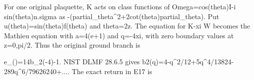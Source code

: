 \documentclass[11pt,a4paper]{article}
\renewcommand{\[}{\begingroup\small\originaldisplaystart}
\renewcommand{\]}{\originaldisplayend\endgroup}
\begin{document}
For one original plaquette, K acts on class functions of
{\ttfamily O\allowbreak{}m\allowbreak{}e\allowbreak{}g\allowbreak{}a\allowbreak{}=\allowbreak{}c\allowbreak{}o\allowbreak{}s\allowbreak{}(\allowbreak{}t\allowbreak{}h\allowbreak{}e\allowbreak{}t\allowbreak{}a\allowbreak{})\allowbreak{}I\allowbreak{}-\allowbreak{}i\allowbreak{} \allowbreak{}s\allowbreak{}i\allowbreak{}n\allowbreak{}(\allowbreak{}t\allowbreak{}h\allowbreak{}e\allowbreak{}t\allowbreak{}a\allowbreak{})\allowbreak{}n\allowbreak{}.\allowbreak{}s\allowbreak{}i\allowbreak{}g\allowbreak{}m\allowbreak{}a\allowbreak{}}
as
{\ttfamily -\allowbreak{}(\allowbreak{}p\allowbreak{}a\allowbreak{}r\allowbreak{}t\allowbreak{}i\allowbreak{}a\allowbreak{}l\allowbreak{}\_\allowbreak{}t\allowbreak{}h\allowbreak{}e\allowbreak{}t\allowbreak{}a\allowbreak{}\textasciicircum{}\allowbreak{}2\allowbreak{}+\allowbreak{}2\allowbreak{}c\allowbreak{}o\allowbreak{}t\allowbreak{}(\allowbreak{}t\allowbreak{}h\allowbreak{}e\allowbreak{}t\allowbreak{}a\allowbreak{})\allowbreak{}p\allowbreak{}a\allowbreak{}r\allowbreak{}t\allowbreak{}i\allowbreak{}a\allowbreak{}l\allowbreak{}\_\allowbreak{}t\allowbreak{}h\allowbreak{}e\allowbreak{}t\allowbreak{}a\allowbreak{})\allowbreak{}}.
Put
{\ttfamily u\allowbreak{}(\allowbreak{}t\allowbreak{}h\allowbreak{}e\allowbreak{}t\allowbreak{}a\allowbreak{})\allowbreak{}=\allowbreak{}s\allowbreak{}i\allowbreak{}n\allowbreak{}(\allowbreak{}t\allowbreak{}h\allowbreak{}e\allowbreak{}t\allowbreak{}a\allowbreak{})\allowbreak{}f\allowbreak{}(\allowbreak{}t\allowbreak{}h\allowbreak{}e\allowbreak{}t\allowbreak{}a\allowbreak{})\allowbreak{}}
and
{\ttfamily t\allowbreak{}h\allowbreak{}e\allowbreak{}t\allowbreak{}a\allowbreak{}=\allowbreak{}2\allowbreak{}z\allowbreak{}}.
The equation for
{\ttfamily K\allowbreak{}-\allowbreak{}x\allowbreak{}i\allowbreak{} \allowbreak{}W\allowbreak{}}
becomes the Mathieu equation with
{\ttfamily a\allowbreak{}=\allowbreak{}4\allowbreak{}(\allowbreak{}e\allowbreak{}+\allowbreak{}1\allowbreak{})\allowbreak{}}
and
{\ttfamily q\allowbreak{}=\allowbreak{}-\allowbreak{}4\allowbreak{}x\allowbreak{}i\allowbreak{}},
with zero boundary values at z=0,pi/2. Thus the original ground branch
is

\[
 e_{}(\xi)=\tfrac14b_2(-4\xi)-1.
\] NIST DLMF 28.6.5 gives
{\ttfamily b\allowbreak{}2\allowbreak{}(\allowbreak{}q\allowbreak{})\allowbreak{}=\allowbreak{}4\allowbreak{}-\allowbreak{}q\allowbreak{}\textasciicircum{}\allowbreak{}2\allowbreak{}/\allowbreak{}1\allowbreak{}2\allowbreak{}+\allowbreak{}5\allowbreak{}q\allowbreak{}\textasciicircum{}\allowbreak{}4\allowbreak{}/\allowbreak{}1\allowbreak{}3\allowbreak{}8\allowbreak{}2\allowbreak{}4\allowbreak{}-\allowbreak{}2\allowbreak{}8\allowbreak{}9\allowbreak{}q\allowbreak{}\textasciicircum{}\allowbreak{}6\allowbreak{}/\allowbreak{}7\allowbreak{}9\allowbreak{}6\allowbreak{}2\allowbreak{}6\allowbreak{}2\allowbreak{}4\allowbreak{}0\allowbreak{}+\allowbreak{}.\allowbreak{}.\allowbreak{}.\allowbreak{}}.
The exact return in E17 is
\end{document}
